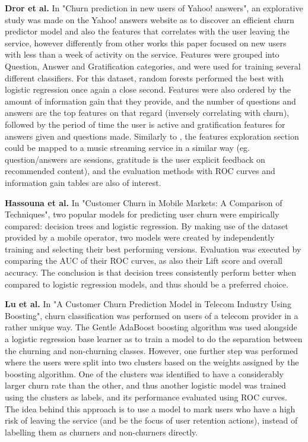 \documentclass{kththesis}
\begin{document}
\textbf{Dror et al.} \citep{Dror2012} In "Churn prediction in new users of Yahoo! answers", an explorative study was made on the Yahoo! answers website as to discover an efficient churn predictor model and also the features that correlates with the user leaving the service, however differently from other works this paper focused on new users with less than a week of activity on the service. Features were grouped into Question, Answer and Gratification categories, and were used for training several different classifiers. For this dataset, random forests performed the best with logistic regression once again a close second. Features were also ordered by the amount of information gain that they provide, and the number of questions and answers are the top features on that regard (inversely correlating with churn), followed by the period of time the user is active and gratification features for answers given and questions made. Similarly to \citep{Pudipeddi2014}, the features exploration section could be mapped to a music streaming service in a similar way (eg. question/answers are sessions, gratitude is the user explicit feedback on recommended content), and the evaluation methods with ROC curves and information gain tables are also of interest. 

\textbf{Hassouna et al.} \citep{Hassouna2015} In "Customer Churn in Mobile Markets: A Comparison of Techniques", two popular models for predicting user churn were empirically compared: decision trees and logistic regression. By making use of the dataset provided by a mobile operator, two models were created by independently training and selecting their best performing versions. Evaluation was executed by comparing the AUC of their ROC curves, as also their Lift score and overall accuracy. The conclusion is that decision trees consistently perform better when compared to logistic regression models, and thus should be a preferred choice.

\textbf{Lu et al.} \citep{Lu2014} In "A Customer Churn Prediction Model in Telecom Industry Using Boosting", churn classification was performed on users of a telecom provider in a rather unique way. The Gentle AdaBoost boosting algorithm was used alongside a logistic regression base learner as to train a model to do the separation between the churning and non-churning classes. However, one further step was performed where the users were split into two clusters based on the weights assigned by the boosting algorithm. One of the clusters was identified to have a considerably larger churn rate than the other, and thus another logistic model was trained using the clusters as labels, and its performance evaluated using ROC curves. The idea behind this approach is to use a model to mark users who have a high risk of leaving the service (and be the focus of user retention actions), instead of labelling them as churners and non-churners directly.
\end{document}

